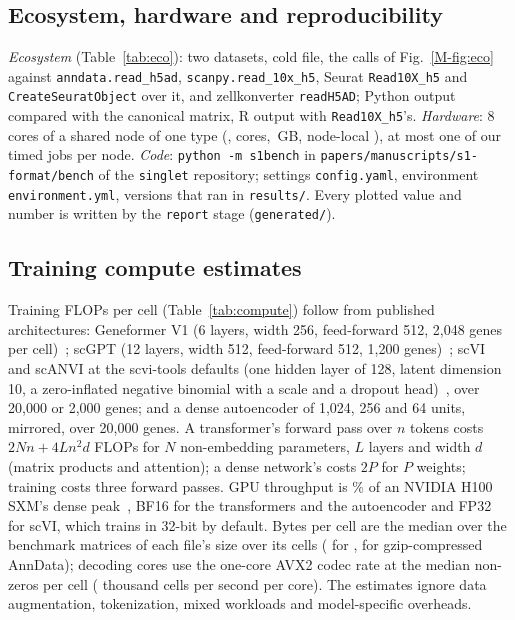 \subsection{Ecosystem, hardware and reproducibility}
\emph{Ecosystem} (Table~\ref{tab:eco}): two datasets, cold file, the calls of Fig.~\ref{M-fig:eco} against
\texttt{anndata.read\_h5ad}, \texttt{scanpy.read\_10x\_h5}, Seurat \texttt{Read10X\_h5} and \texttt{CreateSeuratObject}
over it, and zellkonverter \texttt{readH5AD}; Python output compared with the canonical matrix, R output with
\texttt{Read10X\_h5}'s. \emph{Hardware}: 8 cores of a shared node of one type (,  cores,
\,GB, node-local ), at most one of our timed jobs per node. \emph{Code}: \texttt{python -m
s1bench} in \texttt{papers/manuscripts/s1-format/bench} of the \texttt{singlet} repository; settings
\texttt{config.yaml}, environment \texttt{environment.yml}, versions that ran in \texttt{results/}. Every plotted value
and number is written by the \texttt{report} stage (\texttt{generated/}).

\subsection{Training compute estimates}
\label{sec:mcompute}
Training FLOPs per cell (Table~\ref{tab:compute}) follow from published architectures: Geneformer V1 (6 layers, width
256, feed-forward 512, 2,048 genes per cell)~\cite{theodoris2023transfer}; scGPT (12 layers, width 512, feed-forward 512,
1,200 genes)~\cite{cui2024scgpt}; scVI and scANVI at the scvi-tools defaults (one hidden layer of 128, latent dimension
10, a zero-inflated negative binomial with a scale and a dropout head)~\cite{lopez2018deep,xu2021scanvi}, over 20,000 or
2,000 genes; and a dense autoencoder of 1,024, 256 and 64 units, mirrored, over 20,000 genes. A transformer's forward pass
over $n$ tokens costs $2Nn + 4Ln^2d$ FLOPs for $N$ non-embedding parameters, $L$ layers and width $d$ (matrix products and
attention); a dense network's costs $2P$ for $P$ weights; training costs three forward passes. GPU throughput is
\% of an NVIDIA H100 SXM's dense peak~\cite{nvidia2022h100}, BF16 for the transformers and the autoencoder
and FP32 for scVI, which trains in 32-bit by default. Bytes per cell are the median over the benchmark matrices of each
file's size over its cells ( for \sone,  for gzip-compressed AnnData); decoding cores use
the one-core AVX2 codec rate at the median  non-zeros per cell ( thousand cells per
second per core). The estimates ignore data augmentation, tokenization, mixed workloads and model-specific overheads.

